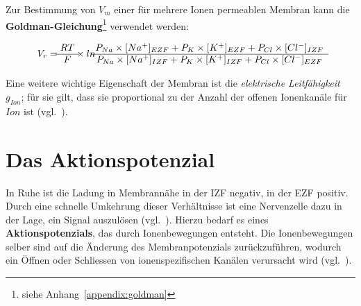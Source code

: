 {\noindent

Zur Bestimmung von $V_m$ einer für mehrere Ionen permeablen Membran kann die \textbf{Goldman-Gleichung}\footnote{
 siehe Anhang~\ref{appendix:goldman}
} verwendet werden:

\begin{equation}
V_{r} = \begin{matrix} RT \\ \hline F \end{matrix}  \times ln \begin{matrix}
  P_{Na} \space  \times \space [Na^+]_{EZF} \space + \space P_{K} \space  \times \space [K^+]_{EZF} \space + \space P_{Cl} \space  \times \space [Cl^-]_{IZF}  \\ \hline
  P_{Na} \space  \times [Na^+]_{IZF} \space + \space P_{K} \space  \times \space [K^+]_{IZF} \space + \space P_{Cl} \space  \times \space [Cl^-]_{EZF}
\end{matrix}
\label{eq:gl-goldman}
\end{equation}

Eine weitere wichtige Eigenschaft der Membran ist die \textit{elektrische Leitfähigkeit} $g_{Ion}$; für sie gilt, dass sie proportional zu der Anzahl der offenen Ionenkanäle für $Ion$ ist (vgl.~\cite[93]{BCP18}).

\section{Das Aktionspotenzial}\label{sec:aktionspotenzial}

In Ruhe ist die Ladung in Membrannähe in der IZF negativ, in der EZF positiv.
Durch eine schnelle Umkehrung dieser Verhältnisse ist eine Nervenzelle dazu in der Lage, ein Signal auszulösen (vgl.~\cite[86]{BCP18}).
Hierzu bedarf es eines \textbf{Aktionspotenzials}, das durch Ionenbewegungen entsteht. Die Ionenbewegungen selber sind auf die Änderung des Membranpotenzials zurückzuführen, wodurch ein Öffnen oder Schliessen von ionenspezifischen Kanälen verursacht wird (vgl.~\cite[96]{BCP18}).

}
